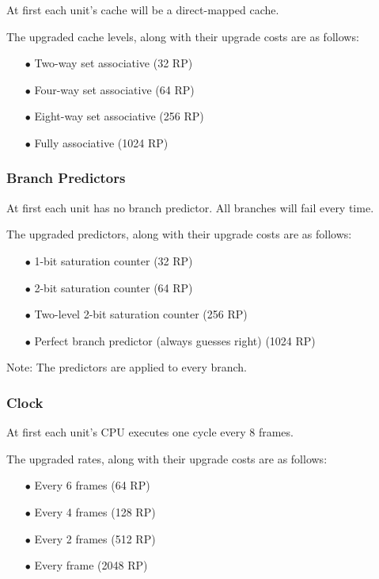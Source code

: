 \documentclass{article}
\begin{document}
At first each unit's cache will be a direct-mapped cache.

The upgraded cache levels, along with their upgrade costs are as follows:

\begin{itemize}[noitemsep]
    \item[$\bullet$] Two-way set associative (32 RP)
    \item[$\bullet$] Four-way set associative (64 RP)
    \item[$\bullet$] Eight-way set associative (256 RP)
    \item[$\bullet$] Fully associative (1024 RP)
\end{itemize}

\subsubsection*{Branch Predictors}

At first each unit has no branch predictor. All branches will fail every time.

The upgraded predictors, along with their upgrade costs are as follows:

\begin{itemize}[noitemsep]
    \item[$\bullet$] 1-bit saturation counter (32 RP)
    \item[$\bullet$] 2-bit saturation counter (64 RP)
    \item[$\bullet$] Two-level 2-bit saturation counter (256 RP)
    \item[$\bullet$] Perfect branch predictor (always guesses right) (1024 RP)
\end{itemize}

Note: The predictors are applied to every branch.

\subsubsection*{Clock}

At first each unit's CPU executes one cycle every 8 frames.

The upgraded rates, along with their upgrade costs are as follows:

\begin{itemize}[noitemsep]
    \item[$\bullet$] Every 6 frames (64 RP)
    \item[$\bullet$] Every 4 frames (128 RP)
    \item[$\bullet$] Every 2 frames (512 RP)
    \item[$\bullet$] Every frame (2048 RP)
\end{itemize}
\end{document}
